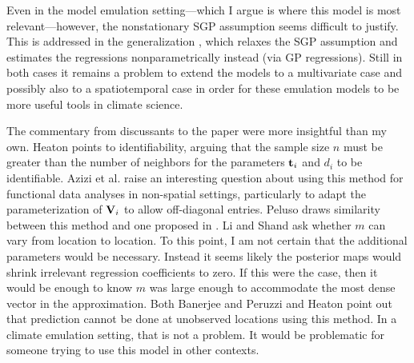 \documentclass[letterpaper]{article}
\begin{document}
  Even in the model emulation setting---which I argue is where this model is most
  relevant---however, the nonstationary SGP assumption seems difficult to justify.
  This is addressed in the generalization \citet{Katzfuss2021b}, which relaxes the
  SGP assumption and estimates the regressions nonparametrically instead (via GP
  regressions). Still in both cases it remains a problem to extend the models to
  a multivariate case and possibly also to a spatiotemporal case in order for
  these emulation models to be more useful tools in climate science.

  The commentary from discussants to the paper were more insightful than my own.
  Heaton points to identifiability, arguing that the sample size $n$ must be greater
  than the number of neighbors for the parameters $\mathbf{t}_{i}$ and $d_{i}$ to be identifiable.
  Azizi et al. raise an interesting question about using this method for functional
  data analyses in non-spatial settings, particularly to adapt the parameterization
  of $\mathbf{V}_{i}$ to allow off-diagonal entries. Peluso draws similarity between
  this method and one proposed in \citet{Ben-David2011}. Li and Shand ask whether
  $m$ can vary from location to location. To this point, I am not certain that
  the additional parameters would be necessary. Instead it seems likely the posterior
  maps would shrink irrelevant regression coefficients to zero. If this were the
  case, then it would be enough to know $m$ was large enough to accommodate the
  most dense vector in the approximation. Both Banerjee and Peruzzi and Heaton
  point out that prediction cannot be done at unobserved locations using this
  method. In a climate emulation setting, that is not a problem. It would be
  problematic for someone trying to use this model in other contexts.



    
\end{document}
